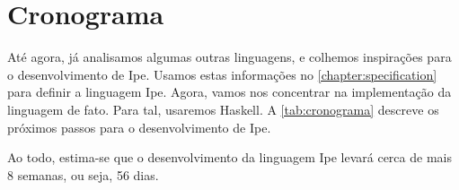 
\chapter{Cronograma}

Até agora, já analisamos algumas outras linguagens, e colhemos inspirações para
o desenvolvimento de Ipe. Usamos estas informações no \autoref{chapter:specification}
para definir a linguagem Ipe. Agora, vamos nos concentrar na implementação da
linguagem de fato. Para tal, usaremos Haskell. A \autoref{tab:cronograma} descreve
os próximos passos para o desenvolvimento de Ipe.

\begin{table}[htb]
    \caption{Cronograma de desenvolvimento para a linguagem Ipe}
    \label{tab:cronograma}
\end{table}

Ao todo, estima-se que o desenvolvimento da linguagem Ipe levará cerca de mais 8
semanas, ou seja, 56 dias.
